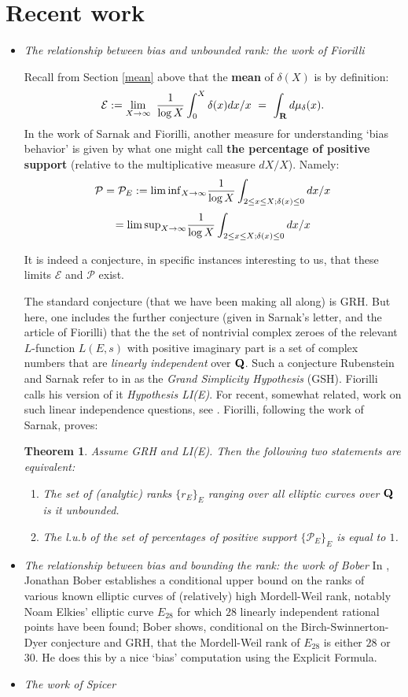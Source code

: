 \documentclass[11pt]{article}
\theoremstyle{plain}
\newtheorem{theorem}{Theorem}[section]
\theoremstyle{definition}
\numberwithin{equation}{section}
\numberwithin{figure}{section}
\numberwithin{table}{section}
\def\Q{\bf{Q}}
\begin{document}
\vskip10pt
\section{Recent work}
\begin{itemize} \item {\it The relationship between bias and unbounded rank: the work of Fiorilli}\label{Fi}

  Recall from Section {\ref{mean}} above that the {\bf mean} of $\delta(X)$ is by definition:
$${\mathcal E} : = \lim_{X \to {\infty}}\ {\frac{1}{\log X}}\int_0^X\delta(x)dx/x \ = \ \int_{\bf R}d\mu_\delta(x).$$
In the work of Sarnak and Fiorilli, another measure for understanding `bias behavior' is given by what one might call {\bf the percentage of positive  support} (relative to the multiplicative measure $dX/X$). Namely:
$${\mathcal P} ={\mathcal P}_E:=  \lim {\rm inf}_{X\to \infty}{\frac{1}{\log X}}\int_{2\le x \le X; \delta(x)\le 0}dx/x$$
$$=   \lim {\rm sup}_{X\to \infty}{\frac{1}{\log X}}\int_{2\le x \le X; \delta(x)\le 0}dx/x$$
 \vskip20pt

  It is indeed a conjecture, in specific instances interesting to us, that these limits ${\mathcal E} $ and ${\mathcal P}$  exist.
   \vskip20pt

   The standard conjecture (that we have been making all along) is GRH. But here, one includes the further conjecture (given in Sarnak's letter, and the article of Fiorilli) that the the set of nontrivial complex zeroes of the relevant $L$-function $L(E,s)$ with positive imaginary part  is a set of complex numbers that are {\it linearly independent} over ${\Q}$. Such a conjecture Rubenstein and Sarnak refer to in \cite{R-S} as the {\it Grand Simplicity Hypothesis} (GSH).  Fiorilli calls his version of it  {\it Hypothesis LI(E)}.  For recent, somewhat related, work on such linear independence questions, see \cite{M-N}.   Fiorilli, following the work of Sarnak,  proves:

   \begin{theorem} Assume GRH and LI(E). Then the following two statements are equivalent:
   \begin{enumerate} \item  The set of (analytic) ranks $\{r_E\}_E$ ranging over all elliptic curves over ${\Q}$ is {it unbounded}.
   \item  The  l.u.b of the set of  {\it percentages of positive support}  $\{{\mathcal P}_E\}_E$ is equal to $1$.\end{enumerate}\end{theorem}
\item{\it The relationship between bias and bounding the rank: the work of Bober}  In \cite{B}, Jonathan Bober  establishes a conditional upper bound on the ranks of various known elliptic curves of (relatively) high Mordell-Weil rank, notably Noam Elkies'  elliptic curve $E_{28}$ for which $28$ linearly independent rational points have been found; Bober shows, conditional on the Birch-Swinnerton-Dyer conjecture and GRH, that the Mordell-Weil rank of $E_{28}$ is either $28$ or $30$. He does this by a nice `bias' computation using the Explicit Formula.
\item{\it The work of Spicer}


\end{itemize}
\end{document}

